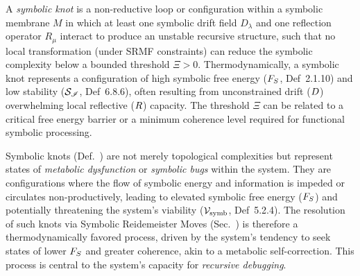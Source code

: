 \begin{definition} %
\label{definition:bk8_symbolic_adjacency}
A \emph{symbolic knot} is a non-reductive loop or configuration within a symbolic membrane \( M \) in which at least one symbolic drift field \( D_\lambda \) and one reflection operator \( R_\mu \) interact to produce an unstable recursive structure, such that no local transformation (under SRMF constraints) can reduce the symbolic complexity below a bounded threshold \( \Xi > 0 \).
Thermodynamically, a symbolic knot represents a configuration of high symbolic free energy ($F_S$, Def~2.1.10) and low stability ($\mathcal{S}_{\mathscr{I}}$, Def~6.8.6), often resulting from unconstrained drift ($D$) overwhelming local reflective ($R$) capacity. The threshold $\Xi$ can be related to a critical free energy barrier or a minimum coherence level required for functional symbolic processing.
\end{definition}
\begin{scholium}
\label{scholium:bk8_symbolic_knots_as_metabolic_dysfunctions}
Symbolic knots (Def.~) are not merely topological complexities but represent states of \emph{metabolic dysfunction} or \emph{symbolic bugs} within the system. They are configurations where the flow of symbolic energy and information is impeded or circulates non-productively, leading to elevated symbolic free energy ($F_S$) and potentially threatening the system's viability ($\mathcal{V}_{\mathrm{symb}}$, Def~5.2.4). The resolution of such knots via Symbolic Reidemeister Moves (Sec.~) is therefore a thermodynamically favored process, driven by the system's tendency to seek states of lower $F_S$ and greater coherence, akin to a metabolic self-correction. This process is central to the system's capacity for \emph{recursive debugging}.
\end{scholium}
